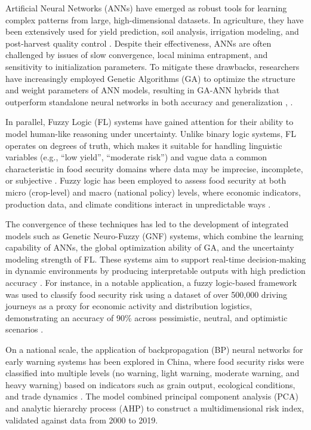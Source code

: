 \documentclass[preprint,12pt]{elsarticle}
\begin{document}
	Artificial Neural Networks (ANNs) have emerged as robust tools for
	learning complex patterns from large, high-dimensional datasets. In
	agriculture, they have been extensively used for yield prediction, soil
	analysis, irrigation modeling, and post-harvest quality control \cite{ref2}.
	Despite their effectiveness, ANNs are often challenged by issues of slow
	convergence, local minima entrapment, and sensitivity to initialization
	parameters. To mitigate these drawbacks, researchers have increasingly
	employed Genetic Algorithms (GA) to optimize the structure and weight
	parameters of ANN models, resulting in GA-ANN hybrids that outperform
	standalone neural networks in both accuracy and generalization \cite{ref3},
	\cite{ref1}.
	
	In parallel, Fuzzy Logic (FL) systems have gained attention for their
	ability to model human-like reasoning under uncertainty. Unlike binary
	logic systems, FL operates on degrees of truth, which makes it suitable
	for handling linguistic variables (e.g., ``low yield'', ``moderate risk'')
	and vague data a common characteristic in food security domains where
	data may be imprecise, incomplete, or subjective \cite{ref4}. Fuzzy logic has
	been employed to assess food security at both micro (crop-level) and
	macro (national policy) levels, where economic indicators, production
	data, and climate conditions interact in unpredictable ways \cite{ref5}.
	
	The convergence of these techniques has led to the development of
	integrated models such as Genetic Neuro-Fuzzy (GNF) systems, which
	combine the learning capability of ANNs, the global optimization ability
	of GA, and the uncertainty modeling strength of FL. These systems aim to
	support real-time decision-making in dynamic environments by producing
	interpretable outputs with high prediction accuracy \cite{ref1}. For instance,
	in a notable application, a fuzzy logic-based framework was used to
	classify food security risk using a dataset of over 500,000 driving
	journeys as a proxy for economic activity and distribution logistics,
	demonstrating an accuracy of 90\% across pessimistic, neutral, and
	optimistic scenarios \cite{ref6}.
	
	On a national scale, the application of backpropagation (BP) neural
	networks for early warning systems has been explored in China, where
	food security risks were classified into multiple levels (no warning,
	light warning, moderate warning, and heavy warning) based on indicators
	such as grain output, ecological conditions, and trade dynamics \cite{ref6}.
	The model combined principal component analysis (PCA) and analytic
	hierarchy process (AHP) to construct a multidimensional risk index,
	validated against data from 2000 to 2019.
	
\end{document}
